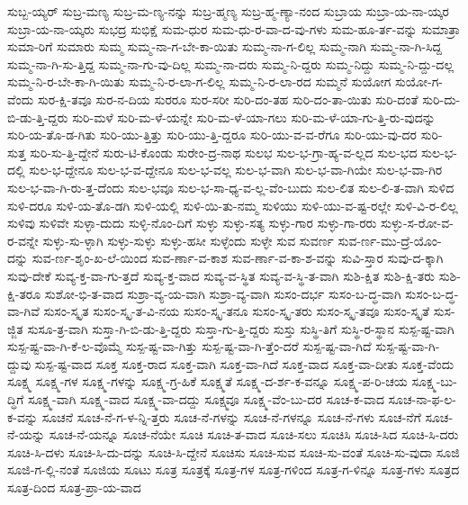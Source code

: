 {ಸುಬ್ಬ-ಯ್ಯರ್
ಸುಬ್ರ-ಮಣ್ಯ
ಸುಬ್ರ-ಮ-ಣ್ಯ-ನನ್ನು
ಸುಬ್ರ-ಹ್ಮಣ್ಯ
ಸುಬ್ರ-ಹ್ಮ-ಣ್ಯಾ-ನಂದ
ಸುಬ್ರಾಯ
ಸುಬ್ರಾ-ಯ-ನಾ-ಯ್ಕರ
ಸುಬ್ರಾ-ಯ-ನಾ-ಯ್ಕರು
ಸುಭದ್ರ
ಸುಭಿಕ್ಷೆ
ಸುಮ-ಧುರ
ಸುಮ-ಧು-ರ-ವಾ-ದ-ವು-ಗಳು
ಸುಮ-ಹೂ-ರ್ತ-ವನ್ನು
ಸುಮಾತ್ರಾ
ಸುಮಾ-ರಿಗೆ
ಸುಮಾರು
ಸುಮ್ಮ
ಸುಮ್ಮ-ನಾ-ಗ-ಬೇ-ಕಾ-ಯಿತು
ಸುಮ್ಮ-ನಾ-ಗ-ಲಿಲ್ಲ
ಸುಮ್ಮ-ನಾಗಿ
ಸುಮ್ಮ-ನಾ-ಗಿ-ಸಿದ್ದ
ಸುಮ್ಮ-ನಾ-ಗಿ-ಸು-ತ್ತಿದ್ದ
ಸುಮ್ಮ-ನಾ-ಗು-ವು-ದಿಲ್ಲ
ಸುಮ್ಮ-ನಾ-ದರು
ಸುಮ್ಮ-ನಿ-ದ್ದರು
ಸುಮ್ಮ-ನಿದ್ದು
ಸುಮ್ಮ-ನಿ-ದ್ದು-ದಲ್ಲ
ಸುಮ್ಮ-ನಿ-ರ-ಬೇ-ಕಾ-ಗಿ-ಯಿತು
ಸುಮ್ಮ-ನಿ-ರ-ಲಾ-ಗ-ಲಿಲ್ಲ
ಸುಮ್ಮ-ನಿ-ರ-ಲಾ-ರದ
ಸುಮ್ಮನೆ
ಸುಯೋಗ
ಸುಯೋ-ಗ-ವೆಂದು
ಸುರ-ಕ್ಷಿ-ತವೂ
ಸುರ-ನ-ದಿಯ
ಸುರರೂ
ಸುರ-ಸರೀ
ಸುರಿ-ದಂ-ತಹ
ಸುರಿ-ದಂ-ತಾ-ಯಿತು
ಸುರಿ-ದಂತೆ
ಸುರಿ-ದು-ಬಿ-ಡು-ತ್ತಿ-ದ್ದರು
ಸುರಿ-ಮಳೆ
ಸುರಿ-ಮ-ಳೆ-ಯನ್ನೇ
ಸುರಿ-ಮ-ಳೆ-ಯಾ-ಗಲು
ಸುರಿ-ಮ-ಳೆ-ಯಾ-ಗು-ತ್ತಿ-ರು-ವುದನ್ನು
ಸುರಿ-ಯ-ತೊ-ಡ-ಗಿತು
ಸುರಿ-ಯು-ತ್ತಿತ್ತು
ಸುರಿ-ಯು-ತ್ತಿ-ದ್ದರೂ
ಸುರಿ-ಯು-ವ-ವ-ರೆಗೂ
ಸುರಿ-ಯು-ವು-ದರ
ಸುರಿ-ಸುತ್ತ
ಸುರಿ-ಸು-ತ್ತಿ-ದ್ದೇನೆ
ಸುರು-ಟಿ-ಕೊಂಡು
ಸುರೇಂ-ದ್ರ-ನಾಥ
ಸುಲಭ
ಸುಲ-ಭ-ಗ್ರಾ-ಹ್ಯ-ವ-ಲ್ಲದ
ಸುಲ-ಭದ
ಸುಲ-ಭ-ದಲ್ಲಿ
ಸುಲ-ಭ-ದ್ದೇನೂ
ಸುಲ-ಭ-ವ-ದ್ದೇನೂ
ಸುಲ-ಭ-ವಲ್ಲ
ಸುಲ-ಭ-ವಾಗಿ
ಸುಲ-ಭ-ವಾ-ಗಿಯೇ
ಸುಲ-ಭ-ವಾ-ಗಿರ
ಸುಲ-ಭ-ವಾ-ಗಿ-ರು-ತ್ತ-ದೆಂದು
ಸುಲ-ಭವೂ
ಸುಲ-ಭ-ಸಾ-ಧ್ಯ-ವ-ಲ್ಲ-ವೆಂ-ಬುದು
ಸುಲ-ಲಿತ
ಸುಲ-ಲಿ-ತ-ವಾಗಿ
ಸುಳಿದ
ಸುಳಿ-ದರೂ
ಸುಳಿ-ಯ-ತೊ-ಡಗಿ
ಸುಳಿ-ಯಲ್ಲಿ
ಸುಳಿ-ಯಿ-ತು-ನಮ್ಮ
ಸುಳಿಯು
ಸುಳಿ-ಯು-ವ-ಷ್ಟ-ರಲ್ಲೇ
ಸುಳಿ-ವಿ-ರ-ಲಿಲ್ಲ
ಸುಳಿವು
ಸುಳಿವೇ
ಸುಳ್ಳಾ-ದುದು
ಸುಳ್ಳಿ-ನೊಂ-ದಿಗೆ
ಸುಳ್ಳು
ಸುಳ್ಳು-ಸತ್ಯ
ಸುಳ್ಳು-ಗಾರ
ಸುಳ್ಳು-ಗಾ-ರರು
ಸುಳ್ಳು-ಸ-ರೋ-ವ-ರ-ವನ್ನೇ
ಸುಳ್ಳು-ಸು-ಳ್ಳಾಗಿ
ಸುಳ್ಳು-ಸುಳ್ಳು
ಸುಳ್ಳು-ಹಸೀ
ಸುಳ್ಳೆಂದು
ಸುಳ್ಳೇ
ಸುವ
ಸುವರ್ಣ
ಸುವ-ರ್ಣ-ಮು-ದ್ರೆ-ಯೊಂ-ದನ್ನು
ಸುವ-ರ್ಣ-ಶೃಂ-ಖ-ಲೆ-ಯಿಂದ
ಸುವ-ರ್ಣಾ-ವ-ಕಾಶ
ಸುವ-ರ್ಣಾ-ವ-ಕಾ-ಶ-ವನ್ನು
ಸುವಿ-ಸ್ತಾರ
ಸುವು-ದ-ಕ್ಕಾಗಿ
ಸುವು-ದೇಕೆ
ಸುವ್ಯ-ಕ್ತ-ವಾ-ಗು-ತ್ತದೆ
ಸುವ್ಯ-ಕ್ತ-ವಾದ
ಸುವ್ಯ-ವ-ಸ್ಥಿತ
ಸುವ್ಯ-ವ-ಸ್ಥಿ-ತ-ವಾಗಿ
ಸುಶಿ-ಕ್ಷಿತ
ಸುಶಿ-ಕ್ಷಿ-ತರು
ಸುಶಿ-ಕ್ಷಿ-ತರೂ
ಸುಶೋ-ಭಿ-ತ-ವಾದ
ಸುಶ್ರಾ-ವ್ಯ-ಯ-ವಾಗಿ
ಸುಶ್ರಾ-ವ್ಯ-ವಾಗಿ
ಸುಸಂ-ದರ್ಭ
ಸುಸಂ-ಬ-ದ್ಧ-ವಾಗಿ
ಸುಸಂ-ಬ-ದ್ಧ-ವಾ-ಗಿವೆ
ಸುಸಂ-ಸ್ಕೃತ
ಸುಸಂ-ಸ್ಕೃ-ತ-ವಿ-ನಯ
ಸುಸಂ-ಸ್ಕೃ-ತನೂ
ಸುಸಂ-ಸ್ಕೃ-ತರು
ಸುಸಂ-ಸ್ಕೃ-ತವೂ
ಸುಸಂ-ಸ್ಕೃತೆ
ಸುಸ-ಜ್ಜಿತ
ಸುಸೂ-ತ್ರ-ವಾಗಿ
ಸುಸ್ತಾ-ಗಿ-ಬಿ-ಡು-ತ್ತಿ-ದ್ದರು
ಸುಸ್ತಾ-ಗು-ತ್ತಿ-ದ್ದರು
ಸುಸ್ತು
ಸುಸ್ಥಿ-ತಿಗೆ
ಸುಸ್ಥಿ-ರ-ಸ್ಥಾನ
ಸುಸ್ಪ-ಷ್ಟ-ವಾಗಿ
ಸುಸ್ಪ-ಷ್ಟ-ವಾ-ಗಿ-ಕೆ-ಲ-ವೊಮ್ಮೆ
ಸುಸ್ಪ-ಷ್ಟ-ವಾ-ಗಿತ್ತು
ಸುಸ್ಪ-ಷ್ಟ-ವಾ-ಗಿ-ತ್ತೆಂ-ದರೆ
ಸುಸ್ಪ-ಷ್ಟ-ವಾ-ಗಿದೆ
ಸುಸ್ಪ-ಷ್ಟ-ವಾ-ಗಿ-ದ್ದುವು
ಸುಸ್ಪ-ಷ್ಟ-ವಾದ
ಸೂಕ್ತ
ಸೂಕ್ತ-ರಾದ
ಸೂಕ್ತ-ವಾಗಿ
ಸೂಕ್ತ-ವಾ-ಗಿದೆ
ಸೂಕ್ತ-ವಾದ
ಸೂಕ್ತ-ವಾ-ದೀತು
ಸೂಕ್ತ-ವೆಂದು
ಸೂಕ್ಷ್ಮ
ಸೂಕ್ಷ್ಮ-ಗಳ
ಸೂಕ್ಷ್ಮ-ಗಳನ್ನು
ಸೂಕ್ಷ್ಮ-ಗ್ರ-ಹಿಕೆ
ಸೂಕ್ಷ್ಮತೆ
ಸೂಕ್ಷ್ಮ-ದ-ರ್ಶ-ಕ-ವನ್ನೂ
ಸೂಕ್ಷ್ಮ-ಪ-ರಿ-ಚಯ
ಸೂಕ್ಷ್ಮ-ಬು-ದ್ಧಿಗೆ
ಸೂಕ್ಷ್ಮ-ವಾಗಿ
ಸೂಕ್ಷ್ಮ-ವಾದ
ಸೂಕ್ಷ್ಮ-ವಾ-ದದ್ದು
ಸೂಕ್ಷ್ಮವೂ
ಸೂಕ್ಷ್ಮ-ವೆಂ-ಬು-ದರ
ಸೂಚ-ಕ-ವಾದ
ಸೂಚ-ನಾ-ಫ-ಲ-ಕ-ವನ್ನು
ಸೂಚನೆ
ಸೂಚ-ನೆ-ಗ-ಳ-ನ್ನಿ-ತ್ತರು
ಸೂಚ-ನೆ-ಗಳನ್ನು
ಸೂಚ-ನೆ-ಗಳನ್ನೂ
ಸೂಚ-ನೆ-ಗಳು
ಸೂಚ-ನೆಗೆ
ಸೂಚ-ನೆ-ಯನ್ನು
ಸೂಚ-ನೆ-ಯನ್ನೂ
ಸೂಚ-ನೆಯೇ
ಸೂಚಿ
ಸೂಚಿ-ತ-ವಾದ
ಸೂಚಿ-ಸಲು
ಸೂಚಿಸಿ
ಸೂಚಿ-ಸಿದ
ಸೂಚಿ-ಸಿ-ದರು
ಸೂಚಿ-ಸಿ-ದಳು
ಸೂಚಿ-ಸಿ-ದು-ದನ್ನು
ಸೂಚಿ-ಸಿ-ದ್ದೇನೆ
ಸೂಚಿಸು
ಸೂಚಿ-ಸುವ
ಸೂಚಿ-ಸು-ವಂತೆ
ಸೂಚಿ-ಸು-ವುದಾ
ಸೂಜಿ
ಸೂಜಿ-ಗ-ಲ್ಲಿ-ನಂತೆ
ಸೂಜಿಯ
ಸೂಟು
ಸೂತ್ರ
ಸೂತ್ರಕ್ಕೆ
ಸೂತ್ರ-ಗಳ
ಸೂತ್ರ-ಗಳಿಂದ
ಸೂತ್ರ-ಗ-ಳಿನ್ನೂ
ಸೂತ್ರ-ಗಳು
ಸೂತ್ರದ
ಸೂತ್ರ-ದಿಂದ
ಸೂತ್ರ-ಪ್ರಾ-ಯ-ವಾದ
}
